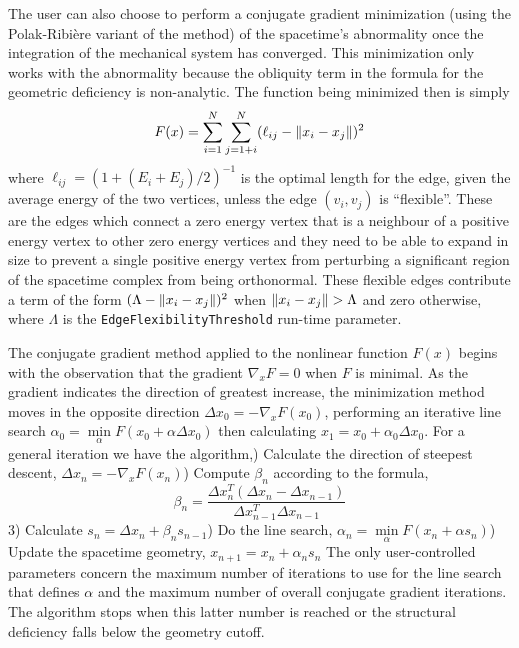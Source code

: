 \documentclass[12pt,letterpaper]{report}
\begin{document}
The user can also choose to perform a conjugate gradient minimization (using the Polak-Ribi\`ere variant of 
the method) of the spacetime's abnormality once the integration of the mechanical system has converged. This 
minimization only works with the abnormality because the obliquity term in the formula for the geometric 
deficiency is non-analytic. The function being minimized then is simply 
\begin{equation}
F(x) = \sum_{i=1}^N \sum_{j=1+i}^N (\ell_{ij} - \left\lVert x_i - x_j\right\rVert)^2
\end{equation}
where $\ell_{ij} = (1+(E_i + E_j)/2)^{-1}$ is the optimal length for the edge, given the average energy of 
the two vertices, unless the edge $(v_i,v_j)$ is ``flexible''. These are the edges which connect a zero 
energy vertex that is a neighbour of a positive energy vertex to other zero energy vertices and they need 
to be able to expand in size to prevent a single positive energy vertex from perturbing a significant 
region of the spacetime complex from being orthonormal. These flexible edges contribute a term of the 
form $(\Lambda - \left\lVert x_i - x_j\right\rVert)^2$ when $\left\lVert x_i - x_j\right\rVert > \Lambda$ and zero otherwise, where $\Lambda$ 
is the \texttt{EdgeFlexibilityThreshold} run-time parameter.
  
The conjugate gradient method applied to the nonlinear function $F(x)$ begins with the observation that 
the gradient $\nabla_x F = 0$ when $F$ is minimal. As the gradient indicates the direction of greatest 
increase, the minimization method moves in the opposite direction $\Delta x_0 = -\nabla_x F(x_0)$, performing 
an iterative line search $\alpha_0 = \min\limits_{\alpha} F(x_0 + \alpha \Delta x_0)$ then calculating 
$x_1 = x_0 + \alpha_0 \Delta x_0$. For a general iteration we have the algorithm,) Calculate the direction of steepest descent, $\Delta x_n = -\nabla_x F(x_n)$) Compute $\beta_n$ according to the formula,
\begin{equation*}
\beta_n = \frac {\Delta x_n^T \left(\Delta x_n - \Delta x_{n-1}\right)}{\Delta x_{n-1}^T \Delta x_{n-1}}
\end{equation*}
3) Calculate $s_n = \Delta x_n + \beta_n s_{n-1}$) Do the line search, $\alpha_n = \min\limits_{\alpha} F(x_n + \alpha s_n)$) Update the spacetime geometry, $x_{n+1} = x_n + \alpha_n s_n$\newline
The only user-controlled parameters concern the maximum number of iterations to use for the line search that 
defines $\alpha$ and the maximum number of overall conjugate gradient iterations. The algorithm stops when 
this latter number is reached or the structural deficiency falls below the geometry cutoff.  
\end{document}
